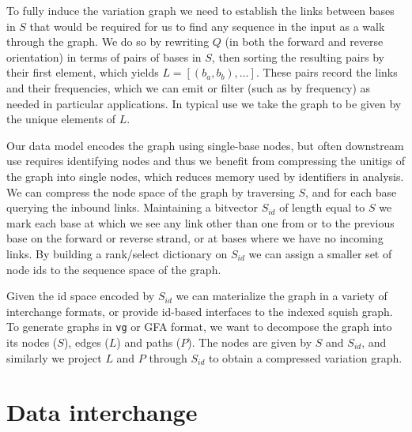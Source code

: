 To fully induce the variation graph we need to establish the links between bases in $S$ that would be required for us to find any sequence in the input as a walk through the graph.
We do so by rewriting $Q$ (in both the forward and reverse orientation) in terms of pairs of bases in $S$, then sorting the resulting pairs by their first element, which yields $L = [(b_{a}, b_{b}), \ldots ]$.
These pairs record the links and their frequencies, which we can emit or filter (such as by frequency) as needed in particular applications.
In typical use we take the graph to be given by the unique elements of $L$.

Our data model encodes the graph using single-base nodes, but often downstream use requires identifying nodes and thus we benefit from compressing the unitigs of the graph into single nodes, which reduces memory used by identifiers in analysis.
We can compress the node space of the graph by traversing $S$, and for each base querying the inbound links.
Maintaining a bitvector $S_{id}$ of length equal to $S$ we mark each base at which we see any link other than one from or to the previous base on the forward or reverse strand, or at bases where we have no incoming links.
By building a rank/select dictionary on $S_{id}$ we can assign a smaller set of node ids to the sequence space of the graph.

Given the id space encoded by $S_{id}$ we can materialize the graph in a variety of interchange formats, or provide id-based interfaces to the indexed squish graph.
To generate graphs in {\tt vg} or GFA format, we want to decompose the graph into its nodes ($S$), edges ($L$) and paths ($P$).
The nodes are given by $S$ and $S_{id}$, and similarly we project $L$ and $P$ through $S_{id}$ to obtain a compressed variation graph.


\section{Data interchange}

